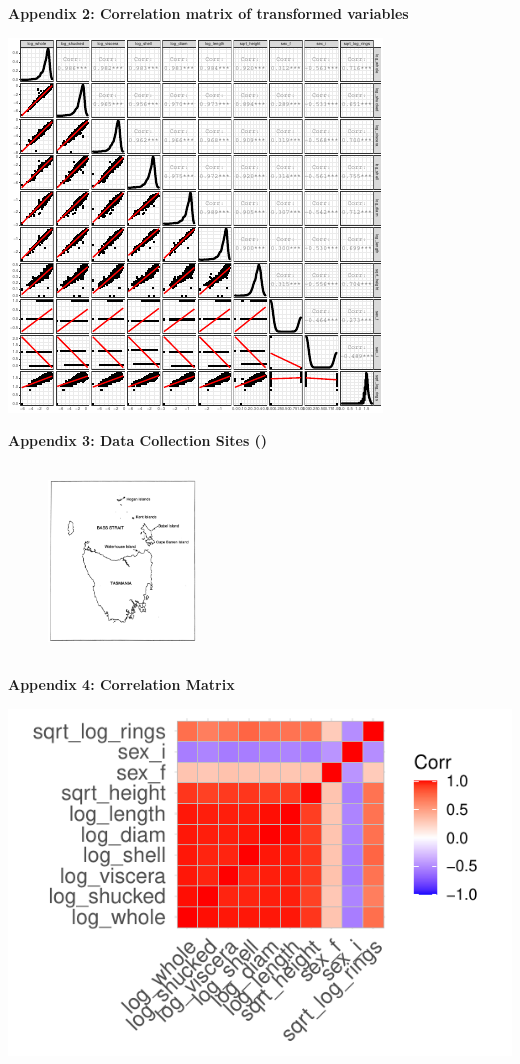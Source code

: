 \documentclass[letterpaper,9pt,twocolumn,twoside,]{pinp}
\begin{document}
\textbf{Appendix 2: Correlation matrix of transformed variables}

\begin{center}\includegraphics{ExecSum_files/figure-latex/unnamed-chunk-11-1} \end{center}

\textbf{Appendix 3: Data Collection Sites (\cite{article})}

\begin{figure}[H]
    \begin{center}
    \includegraphics[width=0.35\textwidth, height=2in]{Independence} 
    \end{center}
\end{figure}

\newpage

\textbf{Appendix 4: Correlation Matrix}

\begin{center}\includegraphics{ExecSum_files/figure-latex/unnamed-chunk-12-1} \end{center}
\end{document}
